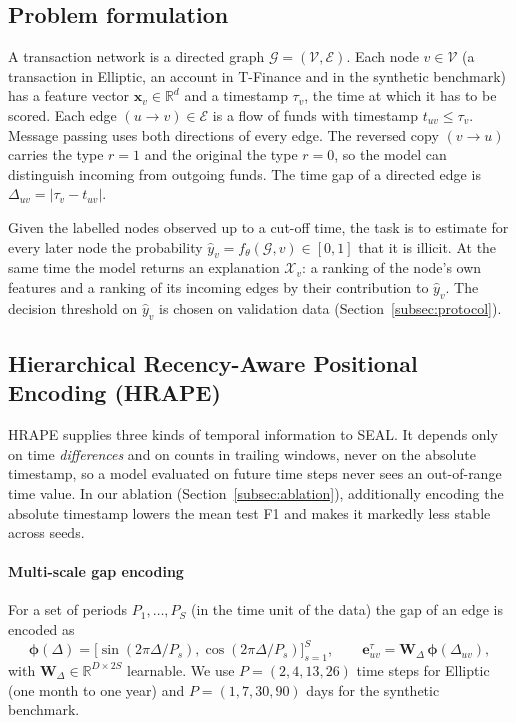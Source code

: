\subsection{Problem formulation}
\label{subsec:problem}

A transaction network is a directed graph $\mathcal{G}=(\mathcal{V},\mathcal{E})$. Each node $v\in\mathcal{V}$ (a transaction in Elliptic, an account in T-Finance and in the synthetic benchmark) has a feature vector $\mathbf{x}_v\in\mathbb{R}^{d}$ and a timestamp $\tau_v$, the time at which it has to be scored. Each edge $(u\to v)\in\mathcal{E}$ is a flow of funds with timestamp $t_{uv}\le\tau_v$. Message passing uses both directions of every edge. The reversed copy $(v\to u)$ carries the type $r=1$ and the original the type $r=0$, so the model can distinguish incoming from outgoing funds. The time gap of a directed edge is $\Delta_{uv}=|\tau_v-t_{uv}|$.

Given the labelled nodes observed up to a cut-off time, the task is to estimate for every later node the probability $\hat y_v=f_\theta(\mathcal{G},v)\in[0,1]$ that it is illicit. At the same time the model returns an explanation $\mathcal{X}_v$: a ranking of the node's own features and a ranking of its incoming edges by their contribution to $\hat y_v$. The decision threshold on $\hat y_v$ is chosen on validation data (Section~\ref{subsec:protocol}).

\subsection{Hierarchical Recency-Aware Positional Encoding (HRAPE)}
\label{subsec:hrape}

HRAPE supplies three kinds of temporal information to SEAL. It depends only on time \emph{differences} and on counts in trailing windows, never on the absolute timestamp, so a model evaluated on future time steps never sees an out-of-range time value. In our ablation (Section~\ref{subsec:ablation}), additionally encoding the absolute timestamp lowers the mean test F1 and makes it markedly less stable across seeds.

\paragraph{Multi-scale gap encoding} For a set of periods $P_1,\dots,P_S$ (in the time unit of the data) the gap of an edge is encoded as
\begin{equation}
\boldsymbol{\phi}(\Delta)=\big[\sin(2\pi\Delta/P_s),\cos(2\pi\Delta/P_s)\big]_{s=1}^{S},\qquad \mathbf{e}^{\tau}_{uv}=\mathbf{W}_{\Delta}\,\boldsymbol{\phi}(\Delta_{uv}),
\label{eq:gap}
\end{equation}
with $\mathbf{W}_{\Delta}\in\mathbb{R}^{D\times 2S}$ learnable. We use $P=(2,4,13,26)$ time steps for Elliptic (one month to one year) and $P=(1,7,30,90)$ days for the synthetic benchmark.

